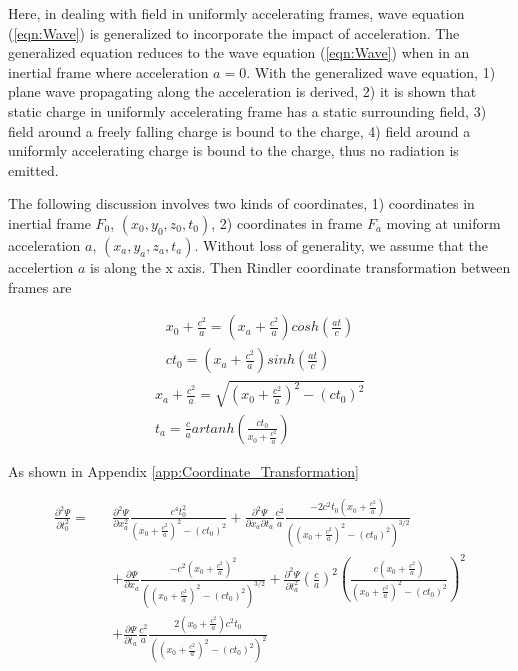 \documentclass[prd,showpacs,preprint]{revtex4-1}
\begin{document}
Here, in dealing with field in uniformly accelerating frames, wave equation (\ref{eqn:Wave}) is generalized to incorporate the impact of acceleration. The generalized equation reduces to the wave equation (\ref{eqn:Wave}) when in an inertial frame where acceleration $a=0$. With the generalized wave equation, 1) plane wave propagating along the acceleration is derived, 2) it is shown that static charge in uniformly accelerating frame has a static surrounding field, 3) field around a freely falling charge is bound to the charge, 4) field around a uniformly accelerating charge is bound to the charge, thus no radiation is emitted.

The following discussion involves two kinds of coordinates, 1) coordinates in inertial frame $F_0$,  $(x_0,y_0,z_0,t_0)$, 2) coordinates in frame $F_a$ moving at uniform acceleration $a$, $(x_a,y_a,z_a,t_a)$. Without loss of generality, we assume that the accelertion $a$ is along the x axis. Then Rindler coordinate transformation between frames are

\begin{eqnarray}
x_0+\frac{c^2}{a}=(x_a+\frac{c^2}{a})cosh(\frac{at}{c})\nonumber\\
ct_0=(x_a+\frac{c^2}{a})sinh(\frac{at}{c})
\label{eqn:coordinates0}
\end{eqnarray}
\begin{eqnarray}
x_a+\frac{c^2}{a}=\sqrt{(x_0+\frac{c^2}{a})^2-(ct_0)^2}\nonumber\\
t_a=\frac{c}{a}artanh(\frac{ct_0}{x_0+\frac{c^2}{a}})
\label{eqn:coordinates1}
\end{eqnarray}

As shown in Appendix {\ref{app:Coordinate_Transformation}}

\begin{eqnarray}
\frac{\partial^2 \Psi}{\partial t_0^2}=&&\frac{\partial^2 \Psi}{\partial x_a^2}\frac{c^4t_0^2}{(x_0+\frac{c^2}{a})^2 - (ct_0)^2} + \frac{\partial^2 \Psi}{\partial x_a\partial t_a}\frac{c^2}{a}\frac{-2c^2t_0(x_0+\frac{c^2}{a})}{((x_0+\frac{c^2}{a})^2-(ct_0)^2)^{3/2}}\nonumber\\
&& + \frac{\partial \Psi}{\partial x_a}\frac{-c^2(x_0+\frac{c^2}{a})^2}{((x_0+\frac{c^2}{a})^2-(ct_0)^2)^{3/2}} + \frac{\partial^2 \Psi}{\partial t_a^2}(\frac{c}{a})^2(\frac{c(x_0+\frac{c^2}{a})}{(x_0+\frac{c^2}{a})^2-(ct_0)^2})^2\nonumber\\
&& + \frac{\partial \Psi}{\partial t_a}\frac{c^2}{a}\frac{2(x_0+\frac{c^2}{a})c^2t_0}{((x_0+\frac{c^2}{a})^2-(ct_0)^2)^2}
\label{eqn:Partial2_Psi_Partial_t2}
\end{eqnarray}
\end{document}
